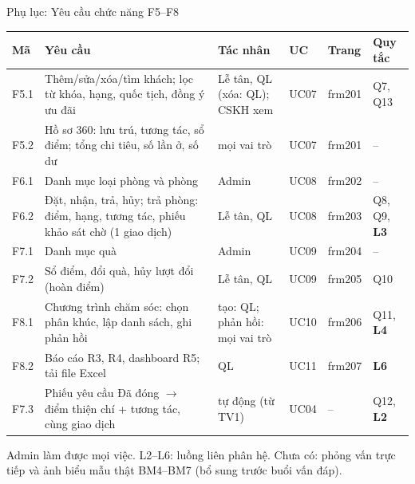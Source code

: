 \begin{frame}{Phụ lục: Yêu cầu chức năng F5--F8 \TB}
\scriptsize
\begin{tabularx}{\textwidth}{@{}L{1.1cm}YL{2.6cm}L{1.0cm}L{1.0cm}L{1.6cm}@{}}
\toprule
\textbf{Mã} & \textbf{Yêu cầu} & \textbf{Tác nhân} & \textbf{UC} & \textbf{Trang} & \textbf{Quy tắc} \\
\midrule
F5.1 & Thêm/sửa/xóa/tìm khách; lọc từ khóa, hạng, quốc tịch, đồng ý ưu đãi & Lễ tân, QL (xóa: QL); CSKH xem & UC07 & frm201 & Q7, Q13 \\
F5.2 & Hồ sơ 360: lưu trú, tương tác, sổ điểm; tổng chi tiêu, số lần ở, số dư & mọi vai trò & UC07 & frm201 & -- \\
F6.1 & Danh mục loại phòng và phòng & Admin & UC08 & frm202 & -- \\
F6.2 & Đặt, nhận, trả, hủy; trả phòng: điểm, hạng, tương tác, phiếu khảo sát chờ (1 giao dịch) & Lễ tân, QL & UC08 & frm203 & Q8, Q9, \textbf{L3} \\
F7.1 & Danh mục quà & Admin & UC09 & frm204 & -- \\
F7.2 & Sổ điểm, đổi quà, hủy lượt đổi (hoàn điểm) & Lễ tân, QL & UC09 & frm205 & Q10 \\
F8.1 & Chương trình chăm sóc: chọn phân khúc, lập danh sách, ghi phản hồi & tạo: QL; phản hồi: mọi vai trò & UC10 & frm206 & Q11, \textbf{L4} \\
F8.2 & Báo cáo R3, R4, dashboard R5; tải file Excel & QL & UC11 & frm207 & \textbf{L6} \\
F7.3 & Phiếu yêu cầu Đã đóng $\to$ điểm thiện chí + tương tác, cùng giao dịch & tự động (từ TV1) & UC04 & -- & Q12, \textbf{L2} \\
\bottomrule
\end{tabularx}
{\tiny Admin làm được mọi việc. L2--L6: luồng liên phân hệ. Chưa có: phỏng vấn trực tiếp và ảnh biểu mẫu thật BM4--BM7 (bổ sung trước buổi vấn đáp).\par}
\end{frame}

